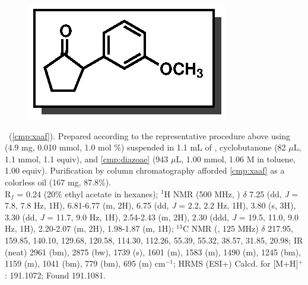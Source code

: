 \vspace{10pt}
\begin{figure}
  \vspace{-25pt}
  \begin{center}
    \includegraphics[scale=0.8]{chp_asymmetric/images/xaaf}
  \end{center}
  \vspace{-30pt}
\end{figure}\noindent \textbf{\CMPxaaf}\ (\ref{cmp:xaaf}). Prepared
according to the representative procedure above using  (4.9 mg,
0.010 mmol, 1.0 mol \%) suspended in 1.1 mL of , cyclobutanone (82
$\mu$L, 1.1 mmol, 1.1 equiv), and \ref{cmp:diazoae} (943 $\mu$L, 1.00 mmol, 1.06
M in toluene, 1.00 equiv). Purification by column chromatography afforded
\ref{cmp:xaaf} as a colorless oil (167 mg, 87.8\%). \\
R$_f$ = 0.24 (20\% ethyl acetate in hexanes); $^1$H NMR (500 MHz, )
$\delta$ 7.25 (dd, \textit{J} = 7.8, 7.8 Hz, 1H), 6.81-6.77 (m, 2H), 6.75 (dd,
\textit{J} = 2.2, 2.2 Hz, 1H), 3.80 (s, 3H), 3.30 (dd, \textit{J} = 11.7, 9.0
Hz, 1H), 2.54-2.43 (m, 2H), 2.30 (ddd, \textit{J} = 19.5, 11.0, 9.0 Hz, 1H),
2.20-2.07 (m, 2H), 1.98-1.87 (m, 1H); $^{13}$C NMR (, 125 MHz)
$\delta$ 217.95, 159.85, 140.10, 129.68, 120.58, 114.30, 112.26, 55.39, 55.32,
38.57, 31.85, 20.98; IR (neat) 2961 (bm), 2875 (bw), 1739 (s), 1601 (m), 1583
(m), 1490 (m), 1245 (bm), 1159 (m), 1041 (bm), 779 (bm), 695 (m) cm$^{-1}$; HRMS
(ESI+) Calcd. for  [M+H]$^+$: 191.1072; Found 191.1081.

